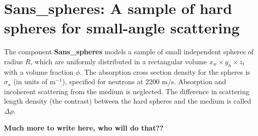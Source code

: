 \section{Sans\_spheres: A sample of hard spheres for small-angle scattering}
\label{sans}


The component {\bf Sans\_spheres} models a sample of small independent
spheres of radius $R$, which are uniformly distributed
in a rectangular volume $x_w \times y_h \times z_t$ with a volume
fraction $\phi$. The absorption cross section density for the spheres
is $\sigma_a$ (in units of m$^{-1}$), specified
for neutrons at 2200 m/s. Absorption and incoherent scattering from the medium
is neglected.
The difference in scattering length density
(the contrast) between the hard spheres and the medium is called $\Delta \rho$.

{\bf Much more to write here, who will do that??}